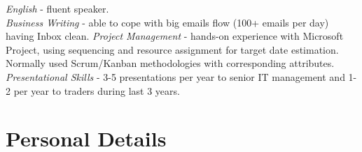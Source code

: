 \documentclass[10pt]{article} %
\begin{document}

{
\textit{English} - fluent speaker.\\
\textit{Business Writing} - able to cope with big emails flow (100+ emails per day) having Inbox clean.
\textit{Project Management} - hands-on experience with Microsoft Project, using sequencing and resource assignment for target date estimation. Normally used Scrum/Kanban methodologies with corresponding attributes.\\
\textit{Presentational Skills} - 3-5 presentations per year to senior IT management and 1-2 per year to traders during last 3 years.
}


\section{Personal Details}

\end{document}
